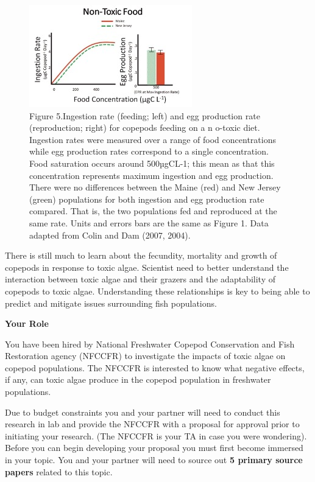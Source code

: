 \documentclass[
]{book}
\begin{document}
\begin{figure}
\centering
\includegraphics{images/figure5.png}
\caption{Figure 5.Ingestion rate (feeding; left) and egg production rate (reproduction; right) for copepods feeding on a n o-toxic diet. Ingestion rates were measured over a range of food concentrations while egg production rates correspond to a single concentration. Food saturation occurs around 500µgCL-1; this mean as that this concentration represents maximum ingestion and egg production. There were no differences between the Maine (red) and New Jersey (green) populations for both ingestion and egg production rate compared. That is, the two populations fed and reproduced at the same rate. Units and errors bars are the same as Figure 1. Data adapted from Colin and Dam (2007, 2004).}
\end{figure}

There is still much to learn about the fecundity, mortality and growth of copepods in response to toxic algae. Scientist need to better understand the interaction between toxic algae and their grazers and the adaptability of copepods to toxic algae. Understanding these relationships is key to being able to predict and mitigate issues surrounding fish populations.

\textbf{Your Role}

You have been hired by National Freshwater Copepod Conservation and Fish Restoration agency (NFCCFR) to investigate the impacts of toxic algae on copepod populations. The NFCCFR is interested to know what negative effects, if any, can toxic algae produce in the copepod population in freshwater populations.

Due to budget constraints you and your partner will need to conduct this research in lab and provide the NFCCFR with a proposal for approval prior to initiating your research. (The NFCCFR is your TA in case you were wondering). Before you can begin developing your proposal you must first become immersed in your topic. You and your partner will need to source out \textbf{5 primary source papers} related to this topic.
\end{document}
